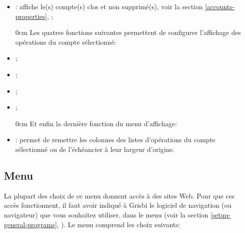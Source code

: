 \begin{itemize}
	\item {}: affiche le(s) compte(s) clos et non supprimé(s), voir la section \vref{accounts-properties}, ;
\begin{addmargin*}[-10pt]{0cm} 	%
	Les quatres fonctions suivantes permettent de configurer l'affichage des opérations du compte sélectionné:
\end{addmargin*}
	\item {};
	\item {};
	\item {};
	\item {};
\begin{addmargin*}[-10pt]{0cm} 	%
	Et enfin la dernière fonction du menu d'affichage:
\end{addmargin*}	
	\item {}: permet de remettre les colonnes des listes d'opérations du compte sélectionné ou de l'échéancier à leur largeur d'origine.
\end{itemize}


\subsection{Menu \label{home-menus-help}}

La plupart des choix de ce menu donnent accès à des sites Web. Pour que ces accès fonctionnent, il faut avoir indiqué à Grisbi le logiciel de navigation (ou navigateur) que vous souhaitez utiliser, dans le menu  (voir la section \vref{setup-general-programs}, ). Le menu  comprend les choix suivants:


